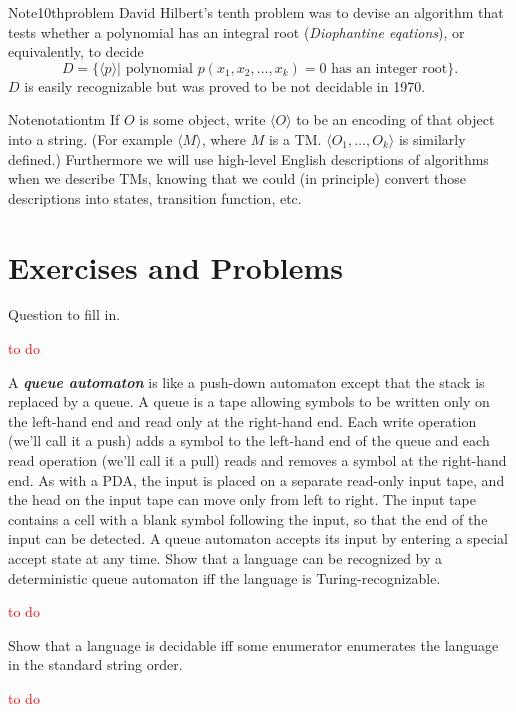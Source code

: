 \begin{reference}{Note}{10thproblem}
  David Hilbert's tenth problem was to devise an algorithm that tests whether a polynomial has an integral root (\textit{Diophantine eqations}), or equivalently, to decide
  \[
    D=\{\langle p\rangle|\text{ polynomial }p(x_1,x_2,\dots,x_k)=0\text{ has an integer root}\}.
  \]
  $D$ is easily recognizable but was proved to be not decidable in 1970.
\end{reference}

\begin{reference}{Note}{notationtm}
  If $O$ is some object, write $\langle O\rangle$ to be an encoding of that object into a string. (For example $\langle M\rangle$, where $M$ is a TM. $\langle O_1,\dots,O_k\rangle$ is similarly defined.) Furthermore we will use high-level English descriptions of algorithms when we describe TMs, knowing that we could (in principle) convert those descriptions into states, transition function, etc.
\end{reference}

\section*{Exercises and Problems}

\setcounter{exercise}{11}

\begin{exercise}{3.12}
  Question to fill in.
\end{exercise}

\textcolor{red}{to do}

\setcounter{exercise}{13}

\begin{exercise}{3.14}
  A \textbf{\textit{queue automaton}} is like a push-down automaton except that the stack is replaced by a queue. A queue is a tape allowing symbols to be written only on the left-hand end and read only at the right-hand end. Each write operation (we’ll call it a push) adds a symbol to the left-hand end of the queue and each read operation (we’ll call it a pull) reads and removes a symbol at the right-hand end. As with a PDA, the input is placed on a separate read-only input tape, and the head on the input tape can move only from left to right. The input tape contains a cell with a blank symbol following the input, so that the end of the input can be detected. A queue automaton accepts its input by entering a special accept state at any time. Show that a language can be recognized by a deterministic queue automaton iff the language is Turing-recognizable.
\end{exercise}

\textcolor{red}{to do}

\setcounter{exercise}{17}

\begin{exercise}{3.18}
  Show that a language is decidable iff some enumerator enumerates the language in the standard string order.
\end{exercise}

\textcolor{red}{to do}
